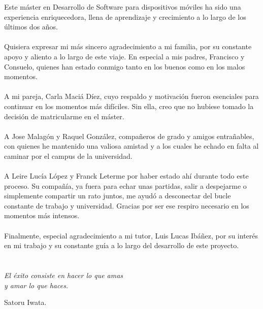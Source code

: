 Este máster en Desarrollo de Software para dispositivos móviles ha sido una experiencia enriquecedora, llena de aprendizaje y crecimiento a lo largo de los últimos dos años.
\\\\
Quisiera expresar mi más sincero agradecimiento a mi familia, por su constante apoyo y aliento a lo largo de este viaje. En especial a mis padres, Francisco y Consuelo, quienes han estado conmigo tanto en los buenos como en los malos momentos.
\\\\
A mi pareja, Carla Maciá Díez, cuyo respaldo y motivación fueron esenciales para continuar en los momentos más difíciles. Sin ella, creo que no hubiese tomado la decisión de matricularme en el máster.
\\\\
A Jose Malagón y Raquel González, compañeros de grado y amigos entrañables, con quienes he mantenido una valiosa amistad y a los cuales he echado en falta al caminar por el campus de la universidad.
\\\\
A Leire Lucía López y Franck Leterme por haber estado ahí durante todo este proceso. Su compañía, ya fuera para echar unas partidas, salir a despejarme o simplemente compartir un rato juntos, me ayudó a desconectar del bucle constante de trabajo y universidad. Gracias por ser ese respiro necesario en los momentos más intensos.
\\\\
Finalmente, especial agradecimiento a mi tutor, Luis Lucas Ibáñez, por su interés en mi trabajo y su constante guía a lo largo del desarrollo de este proyecto.


\cleardoublepage %
\chapter*{}
\thispagestyle{empty}
\setlength{\leftmargin}{0.5\textwidth}
\setlength{\parsep}{0cm}
\addtolength{\topsep}{0.5cm}
\begin{flushright}
\small\em{
El éxito consiste en hacer lo que amas\\
y amar lo que haces.
}
\end{flushright}
\begin{flushright}
\small{
Satoru Iwata.
}
\end{flushright}
\cleardoublepage

